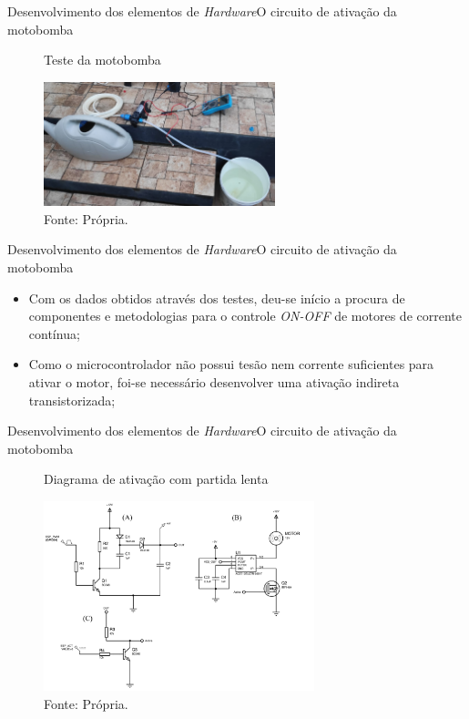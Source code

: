\begin{frame}{Desenvolvimento dos elementos de \textit{Hardware}}{O circuito de ativação da motobomba}
  \begin{figure}[H]
    \centering
    \caption{Teste da motobomba}
    \includegraphics[width=0.6\textwidth]{figuras/teste_motor.jpg}
    \caption*{\tiny{Fonte: Própria.}}
    \label{fig:teste_ativacao_motor}
  \end{figure}
\end{frame}

\begin{frame}{Desenvolvimento dos elementos de \textit{Hardware}}{O circuito de ativação da motobomba}
  \begin{itemize}
    \item Com os dados obtidos através dos testes, deu-se início a procura de componentes e metodologias para o controle \textit{ON-OFF} de motores de corrente contínua;
    \item Como o microcontrolador não possui tesão nem corrente suficientes para ativar o motor, foi-se necessário desenvolver uma ativação indireta transistorizada;
  \end{itemize}

\end{frame}

\begin{frame}{Desenvolvimento dos elementos de \textit{Hardware}}{O circuito de ativação da motobomba}
  \begin{figure}[H]
    \centering
    \caption{Diagrama de ativação com partida lenta}
    \includegraphics[width=0.7\textwidth]{figuras/diagrama_ativação_bomba.png}
    \caption*{\tiny{Fonte: Própria.}}
  \end{figure} 
\end{frame}


